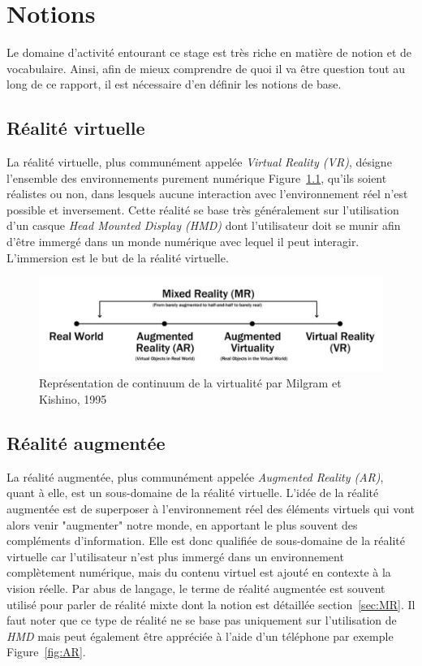 \newpage
\chapter{Notions}
\label{chap:notions}

Le domaine d'activité entourant ce stage est très riche en matière de notion et de vocabulaire. Ainsi, afin de mieux comprendre de quoi il va être question tout au long de ce rapport, il est nécessaire d'en définir les notions de base.

\section{Réalité virtuelle}
La réalité virtuelle\cite{milgram1995augmented}, plus communément appelée \emph{Virtual Reality (VR)}, désigne l'ensemble des environnements purement numérique Figure~\ref{fig:realityspectrum}, qu'ils soient réalistes ou non, dans lesquels aucune interaction avec l'environnement réel n'est possible et inversement. Cette réalité se base très généralement sur l'utilisation d'un casque \emph{Head Mounted Display (HMD)} dont l'utilisateur doit se munir afin d'être immergé dans un monde numérique avec lequel il peut interagir. L'immersion est le but de la réalité virtuelle.

\begin{figure}[H]
\centering
\includegraphics[width=\linewidth]{images/RealitySpectrum}
\caption{Représentation de continuum de la virtualité par Milgram et Kishino, 1995\cite{milgram1995augmented}}
\label{fig:realityspectrum}
\end{figure}

\section{Réalité augmentée}
La réalité augmentée\cite{milgram1995augmented}, plus communément appelée \emph{Augmented Reality (AR)}, quant à elle, est un sous-domaine de la réalité virtuelle. L'idée de la réalité augmentée est de superposer à l'environnement réel des éléments virtuels qui vont alors venir "augmenter" notre monde, en apportant le plus souvent des compléments d'information. Elle est donc qualifiée de sous-domaine de la réalité virtuelle car l'utilisateur n'est plus immergé dans un environnement complètement numérique, mais du contenu virtuel est ajouté en contexte à la vision réelle. Par abus de langage, le terme de réalité augmentée est souvent utilisé pour parler de réalité mixte dont la notion est détaillée section~\ref{sec:MR}.
Il faut noter que ce type de réalité ne se base pas uniquement sur l'utilisation de \emph{HMD} mais peut également être appréciée à l'aide d'un téléphone par exemple Figure~\ref{fig:AR}.

